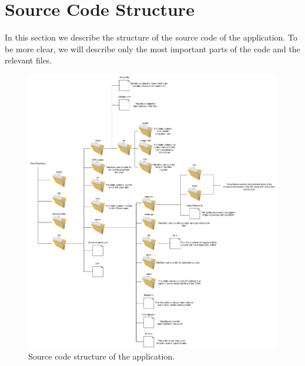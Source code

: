 \section{Source Code Structure}
In this section we describe the structure of the source code of the application.
To be more clear, we will describe only the most important parts of the code and the relevant files.

\begin{figure}[H]
    \centering
    \hspace*{-2cm}
    \includegraphics[scale=0.554]{src/code_structure/code_structure.pdf}
    \caption{Source code structure of the application.}
\end{figure}